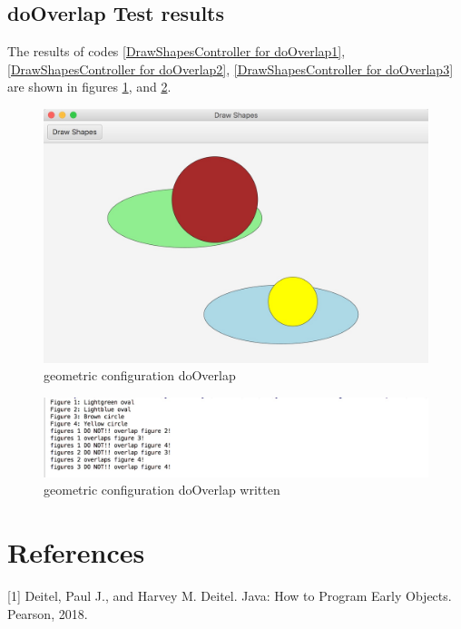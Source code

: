 \documentclass[a4paper,12pt]{article}
\begin{document}
\subsection{doOverlap Test results}
The results of codes  \ref{DrawShapesController for doOverlap1}, \ref{DrawShapesController for doOverlap2}, \ref{DrawShapesController for doOverlap3} are shown in figures \ref{geometric configuration doOverlap}, and 
\ref{geometric configuration doOverlap written }.

\begin{figure}[H]
   \centering
   \includegraphics[width = 17cm]{geometric_configuration_do_overlap} %
   \caption{geometric configuration doOverlap}
   \label{geometric configuration doOverlap}
\end{figure}


\begin{figure}[H]
   \centering
   \includegraphics[width = 17cm]{geometric_configuration_do_overlap_written} %
   \caption{geometric configuration doOverlap written}
   \label{geometric configuration doOverlap written }
\end{figure}













\newpage
\section{References}
[1]  Deitel, Paul J., and Harvey M. Deitel. Java: How to Program Early Objects. Pearson, 2018.
\end{document}
